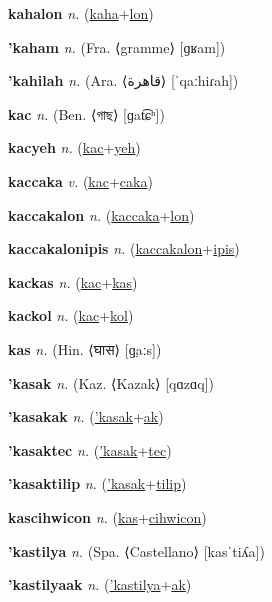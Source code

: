 \textbf{\hypertarget{kahalon}{kahalon}} \textit{n.} (\hyperlink{kaha}{kaha}+\allowbreak \hyperlink{lon}{lon})


\textbf{\hypertarget{'kaham}{'kaham}} \textit{n.} (Fra. ⟨gramme⟩ [ɡʁam])


\textbf{\hypertarget{'kahilah}{'kahilah}} \textit{n.} (Ara. ⟨{\arabics{}قاهرة}⟩ [ˈqaːhiɾah])


\textbf{\hypertarget{kac}{kac}} \textit{n.} (Ben. ⟨{\bengali{}গাছ}⟩ [ɡat͡ɕʰ])


\textbf{\hypertarget{kacyeh}{kacyeh}} \textit{n.} (\hyperlink{kac}{kac}+\allowbreak \hyperlink{yeh}{yeh})


\textbf{\hypertarget{kaccaka}{kaccaka}} \textit{v.} (\hyperlink{kac}{kac}+\allowbreak \hyperlink{caka}{caka})


\textbf{\hypertarget{kaccakalon}{kaccakalon}} \textit{n.} (\hyperlink{kaccaka}{kaccaka}+\allowbreak \hyperlink{lon}{lon})


\textbf{\hypertarget{kaccakalonipis}{kaccakalonipis}} \textit{n.} (\hyperlink{kaccakalon}{kaccakalon}+\allowbreak \hyperlink{ipis}{ipis})


\textbf{\hypertarget{kackas}{kackas}} \textit{n.} (\hyperlink{kac}{kac}+\allowbreak \hyperlink{kas}{kas})


\textbf{\hypertarget{kackol}{kackol}} \textit{n.} (\hyperlink{kac}{kac}+\allowbreak \hyperlink{kol}{kol})


\textbf{\hypertarget{kas}{kas}} \textit{n.} (Hin. ⟨{\devanagari{}घास}⟩ [ɡ̤aːs])


\textbf{\hypertarget{'kasak}{'kasak}} \textit{n.} (Kaz. ⟨Kazak⟩ [qɑzɑq])


\textbf{\hypertarget{'kasakak}{'kasakak}} \textit{n.} (\hyperlink{'kasak}{'kasak}+\allowbreak \hyperlink{ak}{ak})


\textbf{\hypertarget{'kasaktec}{'kasaktec}} \textit{n.} (\hyperlink{'kasak}{'kasak}+\allowbreak \hyperlink{tec}{tec})


\textbf{\hypertarget{'kasaktilip}{'kasaktilip}} \textit{n.} (\hyperlink{'kasak}{'kasak}+\allowbreak \hyperlink{tilip}{tilip})


\textbf{\hypertarget{kascihwicon}{kascihwicon}} \textit{n.} (\hyperlink{kas}{kas}+\allowbreak \hyperlink{cihwicon}{cihwicon})


\textbf{\hypertarget{'kastilya}{'kastilya}} \textit{n.} (Spa. ⟨Castellano⟩ [kasˈtiʎa])


\textbf{\hypertarget{'kastilyaak}{'kastilyaak}} \textit{n.} (\hyperlink{'kastilya}{'kastilya}+\allowbreak \hyperlink{ak}{ak})


